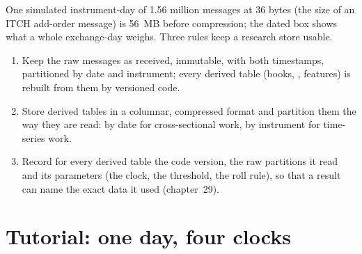 One simulated instrument-day of 1.56 million messages at 36 bytes (the size of an ITCH add-order message) is 56~MB before
compression; the dated box shows what a whole exchange-day weighs. Three rules keep a research store usable.

\begin{method}\label{met:rs:market-data-for-research:store}
\begin{enumerate}
\item Keep the raw messages as received, immutable, with both timestamps, partitioned by date and instrument; every derived
table (books, , features) is rebuilt from them by versioned code.
\item Store derived tables in a columnar, compressed format and partition them the way they are read: by date for
cross-sectional work, by instrument for time-series work.
\item Record for every derived table the code version, the raw partitions it read and its parameters (the clock, the
threshold, the roll rule), so that a result can name the exact data it used (chapter~29).
\end{enumerate}
\end{method}

\section{Tutorial: one day, four clocks}\label{tut:rs:market-data-for-research:clocks}

